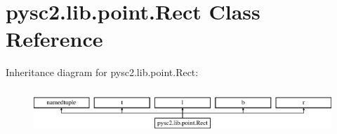 \hypertarget{classpysc2_1_1lib_1_1point_1_1_rect}{}\section{pysc2.\+lib.\+point.\+Rect Class Reference}
\label{classpysc2_1_1lib_1_1point_1_1_rect}
Inheritance diagram for pysc2.\+lib.\+point.\+Rect\+:\begin{figure}[H]
\begin{center}
\leavevmode
\includegraphics[height=1.709924cm]{classpysc2_1_1lib_1_1point_1_1_rect}
\end{center}
\end{figure}
